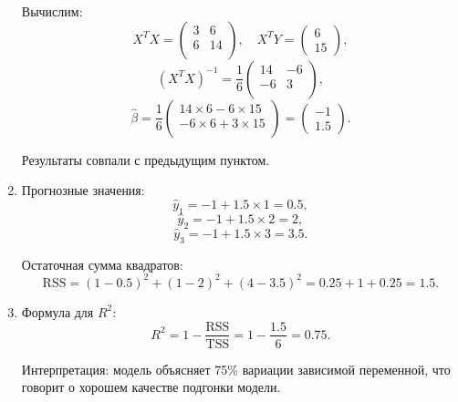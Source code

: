 \documentclass[12pt]{article}
\begin{document}
\begin{sol}
\begin{enumerate}
    Вычислим:
    \[
    X^T X = \begin{pmatrix}
    3 & 6 \\
    6 & 14 \\
    \end{pmatrix}, \quad
    X^T Y = \begin{pmatrix} 6 \\ 15 \end{pmatrix},
    \]
    \[
    (X^T X)^{-1} = \frac{1}{6} \begin{pmatrix}
    14 & -6 \\
    -6 & 3 \\
    \end{pmatrix},
    \]
    \[
    \hat{\beta} = \frac{1}{6} \begin{pmatrix}
    14 \times 6 - 6 \times 15 \\
    -6 \times 6 + 3 \times 15 \\
    \end{pmatrix} = \begin{pmatrix} -1 \\ 1.5 \end{pmatrix}.
    \]
    
    Результаты совпали с предыдущим пунктом.
    
    \item Прогнозные значения:
    \[
    \hat{y}_1 = -1 + 1.5 \times 1 = 0.5,
    \]
    \[
    \hat{y}_2 = -1 + 1.5 \times 2 = 2,
    \]
    \[
    \hat{y}_3 = -1 + 1.5 \times 3 = 3.5.
    \]
    
    Остаточная сумма квадратов:
    \[
    \text{RSS} = (1-0.5)^2 + (1-2)^2 + (4-3.5)^2 = 0.25 + 1 + 0.25 = 1.5.
    \]
    
    \item Формула для $R^2$:
    \[
    R^2 = 1 - \frac{\text{RSS}}{\text{TSS}} = 1 - \frac{1.5}{6} = 0.75.
    \]
    
    Интерпретация: модель объясняет 75\% вариации зависимой переменной, что говорит о хорошем качестве подгонки модели.
\end{enumerate}
\end{sol}
\end{document}

